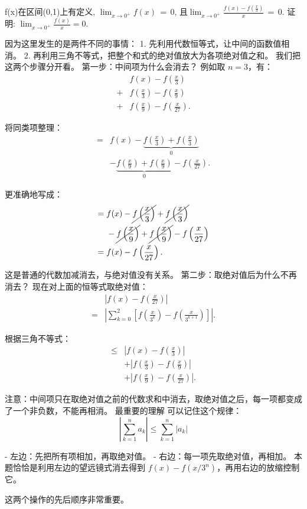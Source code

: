 \documentclass{ctexart}
\begin{document}
f(x)在区间(0,1)上有定义, $\lim_{x \to 0^+}f(x)\,=\,0$,
且$\lim_{x \to {0}^+}\frac{f(x)-f(\frac{x}{3})}{x}\,=\,0$. 证明: $\lim_{x\to 0^+}\frac{f(x)}{x}=0$.


因为这里发生的是两件不同的事情：
1. 先利用代数恒等式，让中间的函数值相消。
2. 再利用三角不等式，把整个和式的绝对值放大为各项绝对值之和。
我们把这两个步骤分开看。
第一步：中间项为什么会消去？
例如取 \(n=3\)，有：
\[
\begin{aligned}
&f(x)-f\left(\frac{x}{3}\right)\\
+{}&f\left(\frac{x}{3}\right)-f\left(\frac{x}{9}\right)\\
+{}&f\left(\frac{x}{9}\right)-f\left(\frac{x}{27}\right).
\end{aligned}
\]

将同类项整理：
\[
\begin{aligned}
={}&f(x)
-\underbrace{f\left(\frac{x}{3}\right)
+f\left(\frac{x}{3}\right)}_{0}\\
&-\underbrace{f\left(\frac{x}{9}\right)
+f\left(\frac{x}{9}\right)}_{0}
-f\left(\frac{x}{27}\right).
\end{aligned}
\]

更准确地写成：
\[
\begin{aligned}
={}&f(x)
-\cancel{f\left(\frac{x}{3}\right)}
+\cancel{f\left(\frac{x}{3}\right)}\\
&-\cancel{f\left(\frac{x}{9}\right)}
+\cancel{f\left(\frac{x}{9}\right)}
-f\left(\frac{x}{27}\right)\\
={}&f(x)-f\left(\frac{x}{27}\right).
\end{aligned}
\]

这是普通的代数加减消去，与绝对值没有关系。
第二步：取绝对值后为什么不再消去？
现在对上面的恒等式取绝对值：
\[
\begin{aligned}
&\left|f(x)-f\left(\frac{x}{27}\right)\right|\\
={}&\left|\sum_{k=0}^{2}
\left[
f\left(\frac{x}{3^k}\right)
-f\left(\frac{x}{3^{k+1}}\right)
\right]\right|.
\end{aligned}
\]

根据三角不等式：
\[
\begin{aligned}
\leq{}&
\left|f(x)-f\left(\frac{x}{3}\right)\right|\\
&+\left|f\left(\frac{x}{3}\right)-f\left(\frac{x}{9}\right)\right|\\
&+\left|f\left(\frac{x}{9}\right)-f\left(\frac{x}{27}\right)\right|.
\end{aligned}
\]

注意：中间项只在取绝对值之前的代数求和中消去，取绝对值之后，每一项都变成了一个非负数，不能再相消。
最重要的理解
可以记住这个规律：
\[
\boxed{
\left|\sum_{k=1}^{n}a_k\right|
\leq \sum_{k=1}^{n}|a_k|
}
\]

- 左边：先把所有项相加，再取绝对值。
- 右边：每一项先取绝对值，再相加。
本题恰恰是利用左边的望远镜式消去得到 \(f(x)-f(x/3^n)\)，再用右边的放缩控制它。

这两个操作的先后顺序非常重要。
\end{document}
